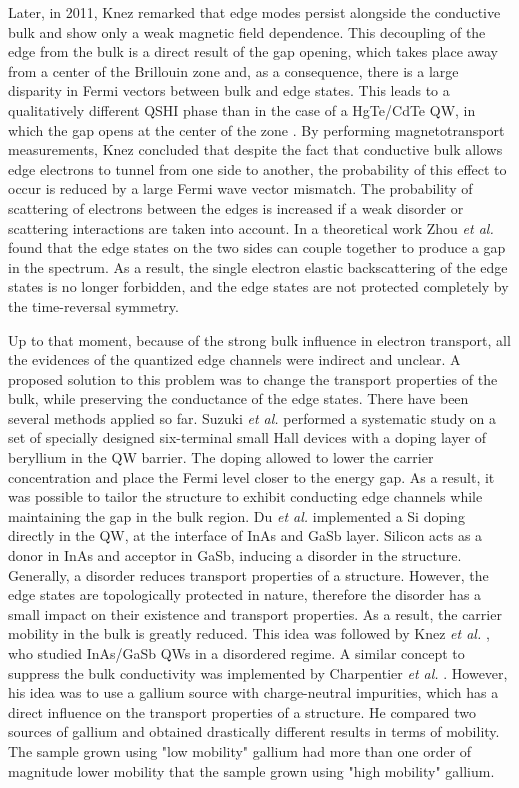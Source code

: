 \documentclass[titlepage,a4paper]{book}
\begin{document}
Later, in 2011, Knez remarked that edge modes persist alongside the conductive bulk and show only a weak magnetic field dependence. This decoupling of the edge from the bulk is a direct result of the gap opening, which takes place away from a center of the Brillouin zone and, as a consequence, there is a large disparity in Fermi vectors between bulk and edge states. This leads to a qualitatively different QSHI phase than in the case of a HgTe/CdTe QW, in which the gap opens at the center of the zone \cite{Knez2_State}. By performing magnetotransport measurements, Knez concluded that despite the fact that conductive bulk allows edge electrons to tunnel from one side to another, the probability of this effect to occur is reduced by a large Fermi wave vector mismatch. The probability of scattering of electrons between the edges is increased if a weak disorder or scattering interactions are taken into account. In a theoretical work Zhou \textit{et al.} \cite{Zhou_State} found that the edge states on the two sides can couple together to produce a gap in the spectrum. As a result, the single electron elastic backscattering of the edge states is no longer forbidden, and the edge states are not protected completely by the time-reversal symmetry. 

Up to that moment, because of the strong bulk influence in electron transport, all the evidences of the quantized edge channels were indirect and unclear. A proposed solution to this problem was to change the transport properties of the bulk, while preserving the conductance of the edge states. There have been several methods applied so far. Suzuki \textit{et al.}\cite{Suzuki_State} performed a systematic study on a set of specially designed six-terminal small Hall devices with a doping layer of beryllium in the QW barrier. The doping allowed to lower the carrier concentration and place the Fermi level closer to the energy gap. As a result, it was possible to tailor the structure to exhibit conducting edge channels while maintaining the gap in the bulk region. Du \textit{et al.} \cite{Du_State} implemented a Si doping directly in the QW, at the interface of InAs and GaSb layer. Silicon acts as a donor in InAs and acceptor in GaSb, inducing a disorder in the structure. Generally, a disorder reduces transport properties of a structure. However, the edge states are topologically protected in nature, therefore the disorder has a small impact on their existence and transport properties. As a result, the carrier mobility in the bulk is greatly reduced. This idea was followed by Knez \textit{et al.} \cite{Knez3_State}, who studied InAs/GaSb QWs in a disordered regime. A similar concept to suppress the bulk conductivity was implemented by Charpentier \textit{et al.} \cite{Charpentier_State}. However, his idea was to use a gallium source with charge-neutral impurities, which has a direct influence on the transport properties of a structure. He compared two sources of gallium and obtained drastically different results in terms of mobility. The sample grown using "low mobility" gallium had more than one order of magnitude lower mobility that the sample grown using "high mobility" gallium. 
\end{document}
